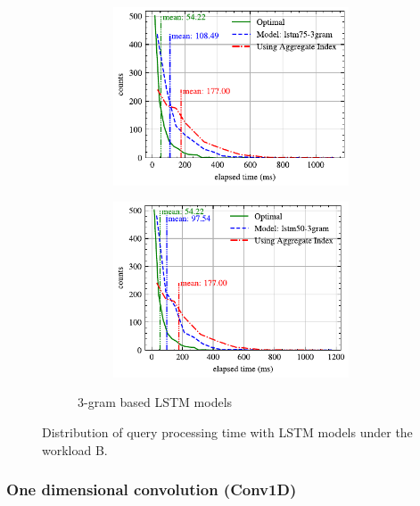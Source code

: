 \begin{figure}[!th]
\begin{subfigure}{0.45\textwidth}
\begin{subfigure}{\textwidth}
			\includegraphics[]{my/graphics/perf_dist_lstm75_3gram_B.pdf}
		\end{subfigure}
		\vfill
		\begin{subfigure}{\textwidth}
			\centering
			\includegraphics[]{my/graphics/perf_dist_lstm50_3gram_B.pdf}
		\end{subfigure}
		\caption{3-gram based LSTM models}
	\end{subfigure}
	\caption{Distribution of query processing time with LSTM models under the workload B.}
	\label{fig:lstm_perf_all_B}
\end{figure}

\subsubsection{One dimensional convolution (Conv1D)}

